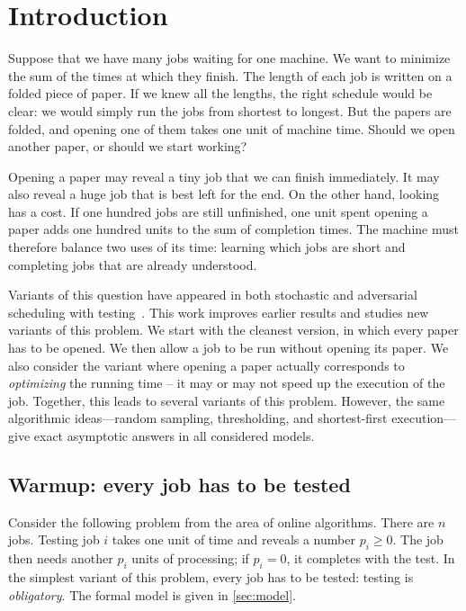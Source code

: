 \section{Introduction}

Suppose that we have many jobs waiting for one machine.  We want to minimize
the sum of the times at which they finish.  The length of each job is written
on a folded piece of paper.  If we knew all the lengths, the right schedule
would be clear: we would simply run the jobs from shortest to longest.  But
the papers are folded, and opening one of them takes one unit of machine time.
Should we open another paper, or should we start working?

Opening a paper may reveal a tiny job that we can finish immediately.  It may
also reveal a huge job that is best left for the end.  On the other hand,
looking has a cost.  If one hundred jobs are still unfinished, one unit spent
opening a paper adds one hundred units to the sum of completion times.  The
machine must therefore balance two uses of its time: learning which jobs are
short and completing jobs that are already understood.

Variants of this question have appeared in both stochastic and adversarial
scheduling with
testing~\cite{LeviMagnantiShaposhnik2019,DurrErlebachMegowMeissner2020,DogeasErlebachLiang2024}.
This work improves earlier results and studies new variants of this problem.  We start
with the cleanest version, in which every paper has to be opened.
We then allow a job to be run without opening its paper. We also consider the variant where opening a paper actually corresponds to \emph{optimizing} the running time -- it may or may not speed up the execution of the job. Together, this leads to several variants of this problem. However, the same algorithmic
ideas---random sampling, thresholding, and shortest-first execution---give
exact asymptotic answers in all considered models.

\subsection{Warmup: every job has to be tested}
\label{sec:intro-obligatory}

Consider the following problem from the area of online algorithms.  There are $n$ jobs.  Testing job $i$ takes
one unit of time and reveals a number $p_i\geq0$.  The job then needs another
$p_i$ units of processing; if $p_i=0$, it completes with the test.  In the simplest variant of this problem, every job has to be tested: testing is \emph{obligatory}.  The formal model
is given in \cref{sec:model}.

